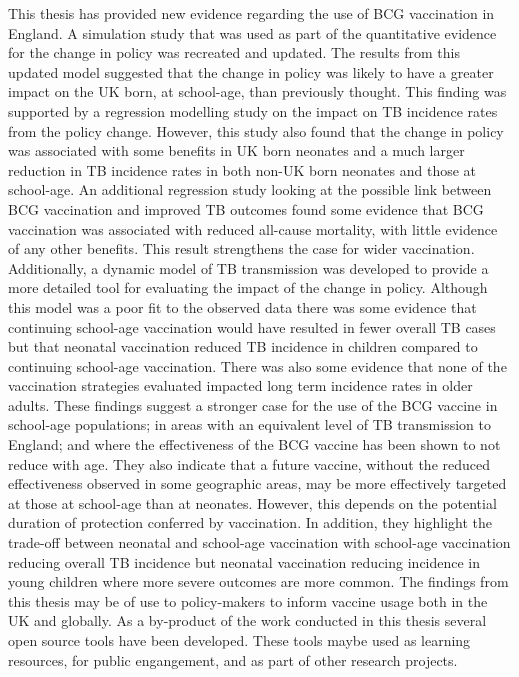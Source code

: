 \documentclass[11pt,twoside]{bristolthesis}
\begin{document}
  This thesis has provided new evidence regarding the use of BCG vaccination in England. A simulation study that was used as part of the quantitative evidence for the change in policy was recreated and updated. The results from this updated model suggested that the change in policy was likely to have a greater impact on the UK born, at school-age, than previously thought. This finding was supported by a regression modelling study on the impact on TB incidence rates from the policy change. However, this study also found that the change in policy was associated with some benefits in UK born neonates and a much larger reduction in TB incidence rates in both non-UK born neonates and those at school-age. An additional regression study looking at the possible link between BCG vaccination and improved TB outcomes found some evidence that BCG vaccination was associated with reduced all-cause mortality, with little evidence of any other benefits. This result strengthens the case for wider vaccination. Additionally, a dynamic model of TB transmission was developed to provide a more detailed tool for evaluating the impact of the change in policy. Although this model was a poor fit to the observed data there was some evidence that continuing school-age vaccination would have resulted in fewer overall TB cases but that neonatal vaccination reduced TB incidence in children compared to continuing school-age vaccination. There was also some evidence that none of the vaccination strategies evaluated impacted long term incidence rates in older adults. These findings suggest a stronger case for the use of the BCG vaccine in school-age populations; in areas with an equivalent level of TB transmission to England; and where the effectiveness of the BCG vaccine has been shown to not reduce with age. They also indicate that a future vaccine, without the reduced effectiveness observed in some geographic areas, may be more effectively targeted at those at school-age than at neonates. However, this depends on the potential duration of protection conferred by vaccination. In addition, they highlight the trade-off between neonatal and school-age vaccination with school-age vaccination reducing overall TB incidence but neonatal vaccination reducing incidence in young children where more severe outcomes are more common. The findings from this thesis may be of use to policy-makers to inform vaccine usage both in the UK and globally. As a by-product of the work conducted in this thesis several open source tools have been developed. These tools maybe used as learning resources, for public engangement, and as part of other research projects.
  
\end{document}
